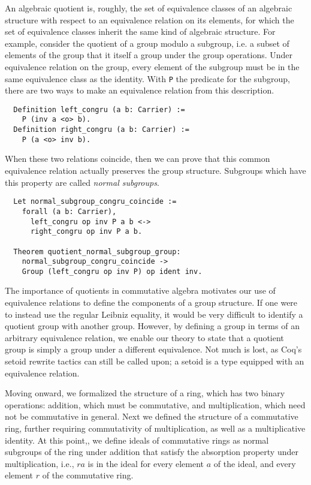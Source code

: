 \documentclass{article}
\begin{document}
An algebraic quotient is, roughly, the set of equivalence classes of an algebraic structure with respect to an equivalence relation on its elements, for which the set of equivalence classes inherit the same kind of algebraic structure. 
For example, consider the quotient of a group modulo a subgroup, i.e. a subset of elements of the group that it itself a group under the group operations. 
Under equivalence relation on the group, every element of the subgroup must be in the same equivalence class as the identity.  
With \texttt{P} the predicate for the subgroup, there are two ways to
make an equivalence relation from this description.

\begin{verbatim}
  Definition left_congru (a b: Carrier) :=
    P (inv a <o> b).
  Definition right_congru (a b: Carrier) :=
    P (a <o> inv b).
\end{verbatim}
When these two relations coincide, then we can prove that this common equivalence
relation actually preserves the group structure. Subgroups which have this
property are called \emph{normal subgroups}.
\begin{verbatim}
  Let normal_subgroup_congru_coincide :=
    forall (a b: Carrier),
      left_congru op inv P a b <->
      right_congru op inv P a b.

  Theorem quotient_normal_subgroup_group:
    normal_subgroup_congru_coincide ->
    Group (left_congru op inv P) op ident inv.
\end{verbatim}

The importance of quotients in commutative algebra motivates our use of equivalence relations to define the
components of a group structure. 
If one were to instead use the regular Leibniz equality,
it would be very difficult to identify a quotient group with another
group. 
However, by  defining a group in terms of an arbitrary equivalence relation, we enable our theory to state that a quotient group is
simply a group under a different equivalence. 
Not much is lost,  as Coq's setoid rewrite tactics can still be called upon; 
a setoid is a type equipped
with an equivalence relation.

Moving onward, we formalized the structure of a ring, which has two binary
operations:
addition, which must be commutative, and multiplication, which need not be commutative in general.
Next we defined the structure of a commutative ring, further requiring commutativity of multiplication, as well as a multiplicative identity. 
At this point,, we define {ideals} of commutative rings as normal subgroups of the ring under
addition that satisfy the absorption property under multiplication, i.e., \(r a\) is in
the ideal for every element \(a\) of the ideal, and every element \(r\) of the commutative ring.
\end{document}
